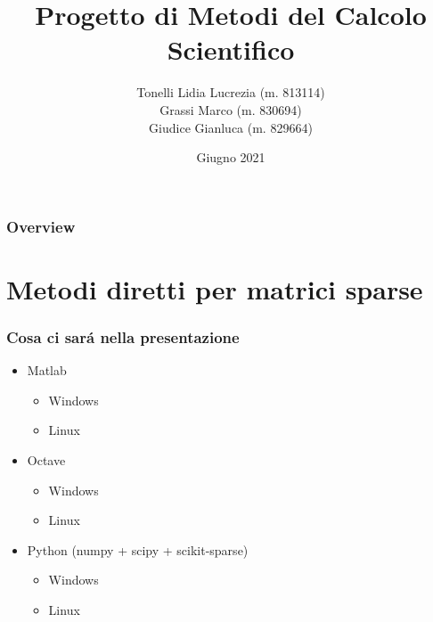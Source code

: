 \documentclass{beamer}
\title{Progetto di Metodi del Calcolo Scientifico} %
\author{Tonelli Lidia Lucrezia (m. 813114)\\
Grassi Marco (m. 830694)\\
Giudice Gianluca (m. 829664)
} %
\institute[University of Milano Bicocca] %
{
University of Milano Bicocca \\ %
\medskip
}
\date{Giugno 2021} %
\begin{document}
\begin{frame}
\titlepage %
\end{frame}

\begin{frame}
\frametitle{Overview} %
\tableofcontents %
\end{frame}


\section{Metodi diretti per matrici sparse}

\begin{frame}
\frametitle{Cosa ci sar\'a nella presentazione}
\begin{itemize}
\item Matlab
\begin{itemize}
\item Windows
\item Linux
\end{itemize}
\item Octave
\begin{itemize}
\item Windows
\item Linux
\end{itemize}
\item Python (numpy + scipy + scikit-sparse)
\begin{itemize}
\item Windows
\item Linux
\end{itemize}
\end{itemize}
\end{frame}
\end{document}
